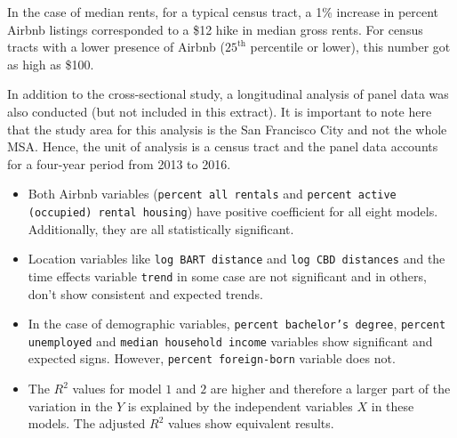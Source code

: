 \documentclass[10pt,letterpaper,onecolumn]{article}
\begin{document}
In the case of median rents, for a typical census tract, a 1\% increase
in percent Airbnb listings corresponded to a \$12 hike in median gross
rents. For census tracts with a lower presence of Airbnb (\(25^\text{th}\)
percentile or lower), this number got as high as \$100.

In addition to the cross-sectional study, a longitudinal analysis of
panel data was also conducted ({\color{red}but not included in this extract}).
It is important to note here that the study area
for this analysis is the San Francisco City and not the whole MSA.
Hence, the unit of analysis is a census tract and the panel data
accounts for a four-year period from 2013 to 2016.

\begin{itemize}
\item Both Airbnb variables (\texttt{percent all rentals} and \texttt{percent active (occupied) rental housing}) have positive coefficient for all eight
models. Additionally, they are all statistically significant.

\item Location variables like \texttt{log BART distance} and \texttt{log CBD distances} and the time effects variable \texttt{trend} in some case are not significant
and in others, don't show consistent and expected trends.

\item In the case of demographic variables, \texttt{percent bachelor's degree}, \texttt{percent unemployed} and \texttt{median household income} variables show
significant and expected signs. However, \texttt{percent foreign-born} variable
does not.
\item
The \(R^2\) values for model \(1\) and \(2\) are higher and therefore a larger part of the variation in the \(Y\) is explained by the
independent variables \(X\) in these models. The adjusted \(R^2\) values show equivalent results.
\end{itemize}
\end{document}
